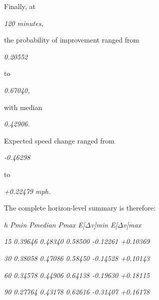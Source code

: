 Finally, at

\begin{center}\textit{120 minutes,}\end{center}

the probability of improvement ranged from

\begin{center}\textit{0.20552}\end{center}

to

\begin{center}\textit{0.67040,}\end{center}

with median

\begin{center}\textit{0.42906.}\end{center}

Expected speed change ranged from

\begin{center}\textit{-0.46298}\end{center}

to

\begin{center}\textit{+0.22479 mph.}\end{center}

The complete horizon-level summary is therefore:

\begin{center}\textit{h      Pmin     Pmedian          Pmax   E[\ensuremath{\Delta}v]min                             E[\ensuremath{\Delta}v]max}\end{center}

\begin{center}\textit{15    0.39646   0.48340         0.58500 -0.12261                             +0.10369}\end{center}

\begin{center}\textit{30    0.38058   0.47086         0.58450 -0.14528                             +0.10143}\end{center}

\begin{center}\textit{60    0.34578   0.44906         0.64138 -0.19630                             +0.18115}\end{center}

\begin{center}\textit{90    0.27764   0.43178         0.62616 -0.31407                             +0.16178}\end{center}

